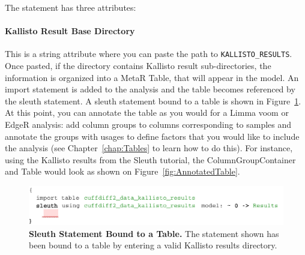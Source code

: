 The statement has three attributes:
\paragraph{Kallisto Result Base Directory}
This is a string attribute where you can paste the path to \texttt{KALLISTO\_RESULTS}. Once pasted, if the directory contains Kallisto result sub-directories, the information is organized into a MetaR Table, that will appear in the model. An import statement is added to the analysis and the table becomes referenced by the sleuth statement. A sleuth statement bound to a table is shown in Figure~\ref{fig:KallistoBoundToTable}. At this point, you can annotate the table as you would for a Limma voom or EdgeR analysis: add column groups to columns corresponding to samples and annotate the groups with usages to define factors that you would like to include the analysis (see Chapter~\ref{chap:Tables} to learn how to do this).
For instance, using the Kallisto results from the Sleuth tutorial, the ColumnGroupContainer and Table would look as shown on Figure~\ref{fig:AnnotatedTable}.



\begin{figure}[h!tbp]
\centering
  \includegraphics[width=\figWidthWide]{figures/SleuthBoundToTable-1.pdf}
\caption[Sleuth Statement Bound to a Table.]{\textbf{Sleuth Statement Bound to a Table.} The statement shown has been bound to a table by entering a valid Kallisto results directory.}
\label{fig:KallistoBoundToTable}
\end{figure}

